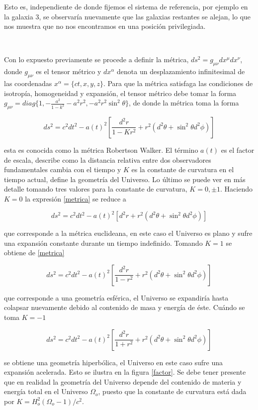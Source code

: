 Esto es, independiente de donde fijemos el sistema de referencia, 
por ejemplo en la galaxia 3, se observaría nuevamente 
que las galaxias restantes se alejan, lo que nos muestra que no nos encontramos 
en una posición privilegiada. 

\

Con lo expuesto previamente se procede a definir la métrica, 
$ds^2 = g_{\mu\nu}dx^{\mu}dx^{\nu}$, donde $g_{\mu\nu}$ es el 
tensor métrico y $dx^{\alpha}$ denota un desplazamiento infinitesimal 
de las coordenadas $x^{\alpha} = \{ct,x,y,z\}$.  Para que la métrica 
satisfaga las condiciones de isotropía, homogeneidad y expansión, el tensor 
métrico debe tomar la forma $ g_{\mu\nu} = diag\{1,-\frac{a^2}{1-k^2}
-a^2r^2,-a^2r^2\sin^2\theta\}$, de donde la métrica toma la forma

\begin{equation}
ds^2= c^2dt^2-a(t)^2\left[\frac{d^2r}{1-Kr^2} +r^2(d^2\theta
 + \sin^2\theta d^2\phi )\right]
\label{metrica}
\end{equation} 	

esta es conocida como la métrica Robertson Walker. El término $a(t)$ 
es el factor de escala, describe como la distancia relativa entre 
dos observadores fundamentales cambia con el tiempo y $K$ es la 
constante de curvatura en el tiempo actual, define la geometría
del Universo. Lo último se puede ver en más detalle tomando tres
valores para la constante de curvatura, $K=0,\pm 1$. 
Haciendo $K=0$ la expresión \ref{metrica} se reduce a 

\[ds^2= c^2dt^2-a(t)^2\left[d^2r +r^2(d^2\theta + 
\sin^2\theta d^2\phi )\right]\]

que corresponde a la métrica euclideana, en este caso el Universo 
es plano y sufre una expansión constante durante un tiempo indefinido. 
Tomando $K=1$ se obtiene de \ref{metrica}
 
\[ds^2= c^2dt^2-a(t)^2\left[\frac{d^2r}{1-r^2} +r^2(d^2\theta +
\sin^2\theta d^2\phi)\right]\]

que corresponde a una geometr\'ia esf\'erica, el Universo se 
expandiría hasta colapsar nuevamente debido al contenido de masa
y energía de éste. Cuándo se toma $K=-1$

\[ ds^2= c^2dt^2-a(t)^2\left[\frac{d^2r}{1+r^2} +
r^2(d^2\theta + \sin^2\theta d^2\phi)\right]\]

se obtiene una geometr\'ia hiperbólica, el Universo en este 
caso sufre una expansión a\-ce\-le\-ra\-da. Esto se ilustra en la 
figura \ref{factor}. Se debe tener presente que  en realidad
la geometría del Universo  depende del contenido
de materia y energía total en el Universo $\Omega_o$, 
puesto que la constante de curvatura está dada por 
$K = H_o^2(\Omega_o -1)/c^2$. 
 
